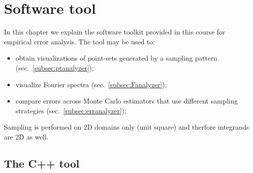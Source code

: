 %
 \chapter{Software tool}
In this chapter we explain the software toolkit provided in this course for empirical error analysis. The tool may be used to:
\begin{itemize}
 \item obtain visualizations of point-sets generated by a sampling pattern (sec.~\ref{subsec:ptanalyzer});
 \item visualize Fourier spectra (sec.~\ref{subsec:Fanalyzer}); 
 \item compare errors across Monte Carlo estimators that use different sampling strategies (sec.~\ref{subsec:erranalyzer}); 
\end{itemize}
Sampling is performed on 2D domains only (unit square) and therfore integrands are 2D as well. 

\section{The C++ tool}
